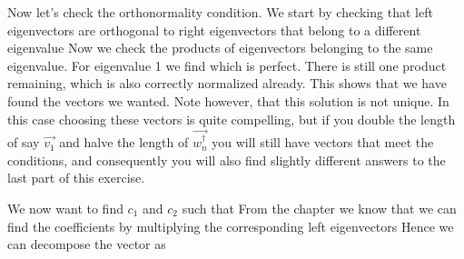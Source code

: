 Now let's check the orthonormality condition. We start by checking that left eigenvectors are orthogonal to right eigenvectors that belong to a different eigenvalue
Now we check the products of eigenvectors belonging to the same eigenvalue. For eigenvalue 1 we find 
which is perfect. There is still one product remaining, 
which is also correctly normalized already. This shows that we have found the vectors we wanted. Note however, that this solution is not unique. In this case choosing these vectors is quite compelling, but if you double the length of say $\vec{v_1}$ and halve the length of $\vec{w_n^\dag}$ you will still have vectors that meet the conditions, and consequently you will also find slightly different answers to the last part of this exercise. 

We now want to find $c_1$ and $c_2$ such that 
From the chapter we know that we can find the coefficients by multiplying the corresponding left eigenvectors
Hence we can decompose the vector as 

\solutionend